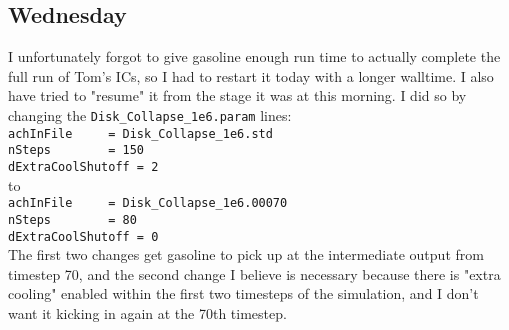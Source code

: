 \documentclass[11pt,letterpaper]{article}
\begin{document}
\subsection*{Wednesday}
I unfortunately forgot to give gasoline enough run time to actually complete
the full run of Tom's ICs, so I had to restart it today with a longer walltime.
I also have tried to "resume" it from the stage it was at this morning.  I did
so by changing the \verb!Disk_Collapse_1e6.param! lines:\\
\verb!achInFile		= Disk_Collapse_1e6.std!\\
\verb!nSteps		= 150!\\
\verb!dExtraCoolShutoff	= 2!\\
to\\
\verb!achInFile		= Disk_Collapse_1e6.00070!\\
\verb!nSteps		= 80!\\
\verb!dExtraCoolShutoff	= 0!\\
The first two changes get gasoline to pick up at the intermediate output from 
timestep 70, and the second change I believe is necessary because there is
"extra cooling" enabled within the first two timesteps of the simulation,
and I don't want it kicking in again at the 70th timestep.
\end{document}
